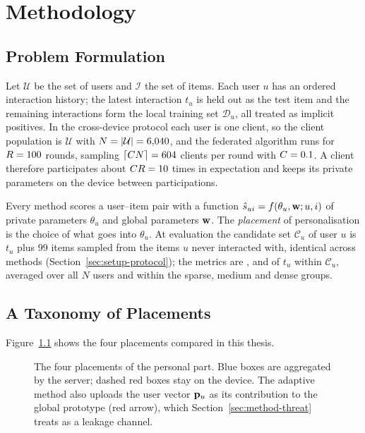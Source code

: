 \chapter{Methodology}
\label{ch:method}

\section{Problem Formulation}
\label{sec:method-problem}

Let $\mathcal{U}$ be the set of users and $\mathcal{I}$ the set of items. Each user $u$ has an
ordered interaction history; the latest interaction $t_u$ is held out as the test item and the
remaining interactions form the local training set $\mathcal{D}_u$, all treated as implicit
positives. In the cross-device protocol each user is one client, so the client population is
$\mathcal{U}$ with $N=|\mathcal{U}|=6{,}040$, and the federated algorithm runs for
$R=100$ rounds, sampling $\lceil C N\rceil = 604$ clients per round with
$C=0.1$. A client therefore participates about $CR = 10$ times
in expectation and keeps its private parameters on the device between participations.

Every method scores a user--item pair with a function $\hat{s}_{ui} = f(\theta_u, \mathbf{w};
u, i)$ of private parameters $\theta_u$ and global parameters $\mathbf{w}$. The \emph{placement}
of personalisation is the choice of what goes into $\theta_u$. At evaluation the candidate set
$\mathcal{C}_u$ of user $u$ is $t_u$ plus 99 items sampled from the items $u$ never interacted
with, identical across methods (Section~\ref{sec:setup-protocol}); the metrics are \hr{},
\ndcg{} and \mrr{} of $t_u$ within $\mathcal{C}_u$, averaged over all $N$ users and within the
sparse, medium and dense groups.

\section{A Taxonomy of Placements}
\label{sec:method-taxonomy}

Figure~\ref{fig:placement} shows the four placements compared in this thesis.

\begin{figure}[htbp]
  \centering
  
  \caption{The four placements of the personal part. Blue boxes are aggregated by the server;
  dashed red boxes stay on the device. The adaptive method also uploads the user vector
  $\mathbf{p}_u$ as its contribution to the global prototype (red arrow), which Section~\ref{sec:method-threat}
  treats as a leakage channel.}
  \label{fig:placement}
\end{figure}

